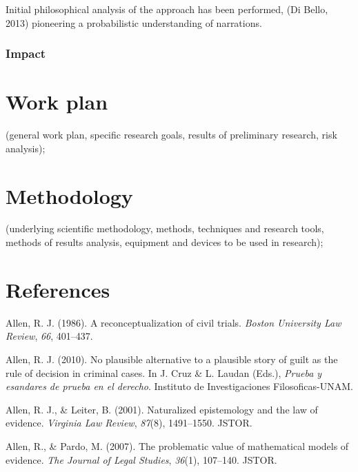 \documentclass[11pt,dvipsnames,enabledeprecatedfontcommands]{scrartcl}
\begin{document}
Initial philosophical analysis of the approach has been performed, (Di
Bello, 2013) pioneering a probabilistic understanding of narrations.


\subsubsection{Impact}\label{impact}

\section{Work plan}\label{work-plan}

(general work plan, specific research goals, results of preliminary
research, risk analysis);

\section{Methodology}\label{methodology}

(underlying scientific methodology, methods, techniques and research
tools, methods of results analysis, equipment and devices to be used in
research);

\section*{References}\label{references}

\hypertarget{refs}{}
\hypertarget{ref-Allen1986A-Reconceptuali}{}
Allen, R. J. (1986). A reconceptualization of civil trials. \emph{Boston
University Law Review}, \emph{66}, 401--437.

\hypertarget{ref-Allen2010No-Plausible-Al}{}
Allen, R. J. (2010). No plausible alternative to a plausible story of
guilt as the rule of decision in criminal cases. In J. Cruz \& L. Laudan
(Eds.), \emph{Prueba y esandares de prueba en el derecho}. Instituto de
Investigaciones Filosoficas-UNAM.

\hypertarget{ref-allen2001naturalized}{}
Allen, R. J., \& Leiter, B. (2001). Naturalized epistemology and the law
of evidence. \emph{Virginia Law Review}, \emph{87}(8), 1491--1550.
JSTOR.

\hypertarget{ref-allen2007problematic}{}
Allen, R., \& Pardo, M. (2007). The problematic value of mathematical
models of evidence. \emph{The Journal of Legal Studies}, \emph{36}(1),
107--140. JSTOR.
\end{document}

